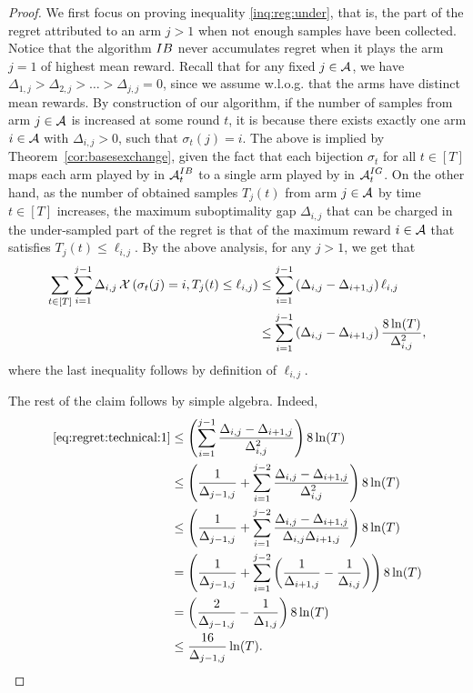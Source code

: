 \begin{proof}
We first focus on proving inequality \eqref{inq:reg:under}, that is, the part of the regret attributed to an arm $j >1$ when not enough samples have been collected. Notice that the algorithm $IB$ never accumulates regret when it plays the arm $j=1$ of highest mean reward. Recall that for any fixed $j \in \operatorname{\mathcal{A}}$, we have $\Delta_{1,j} > \Delta_{2,j} > \dots > \Delta_{j,j} = 0$, since we assume w.l.o.g. that the arms have distinct mean rewards. By construction of our algorithm, if the number of samples from arm $j \in \operatorname{\mathcal{A}}$ is increased at some round $t$, it is because there exists exactly one arm $i \in \operatorname{\mathcal{A}}$ with $\Delta_{i,j} > 0$, such that $\sigma_t(j) = i$. The above is implied by Theorem~\ref{cor:basesexchange}, given the fact that each bijection $\sigma_t$ for all $t \in [T]$ maps each arm played by \UCB in $\operatorname{\mathcal{A}}^{IB}_t$ to a single arm played by \IG in $\operatorname{\mathcal{A}}_t^{IG}$. On the other hand, as the number of obtained samples $T_j(t)$ from arm $j \in \operatorname{\mathcal{A}}$ by time $t\in [T]$ increases, the maximum suboptimality gap $\Delta_{i,j}$ that can be charged in the under-sampled part of the regret is that of the maximum reward $i \in \operatorname{\mathcal{A}}$ that satisfies $T_j(t) \leq \ell_{i,j}$. By the above analysis, for any $j>1$, we get that 
\begin{align}
\sum_{t \in [T]} \sum^{j-1}_{i = 1} \Delta_{i , j} \mathop{\mathcal{X}\left(\sigma_t(j)=i, T_j(t) \leq \ell_{i,j}\right)} \notag
&\leq \sum^{j-1}_{i=1} \left(\Delta_{i,j} -  \Delta_{i+1,j}\right)\ell_{i,j} \notag\\
&\leq \sum^{j-1}_{i=1} \left(\Delta_{i,j} -  \Delta_{i+1,j}\right)\frac{8 \ln(T)}{\Delta^2_{i,j}} \label{eq:regret:technical:1},
\end{align}
where the last inequality follows by definition of $\ell_{i,j}$.

The rest of the claim follows by simple algebra. Indeed,
\begin{align*}
    \eqref{eq:regret:technical:1}&\leq \left(\sum^{j-1}_{i=1}\frac{\Delta_{i,j} - \Delta_{i+1,j}}{\Delta^2_{i,j}}\right)8 \ln(T) \notag\\
    &\leq \left(\frac{1}{\Delta_{j-1,j}} + \sum^{j-2}_{i=1}\frac{\Delta_{i,j} - \Delta_{i+1,j}}{\Delta^2_{i,j}}\right)8 \ln(T) \notag\\
    &\leq \left(\frac{1}{\Delta_{j-1,j}} + \sum^{j-2}_{i=1}\frac{\Delta_{i,j} - \Delta_{i+1,j}}{\Delta_{i,j} \Delta_{i+1,j}}\right)8 \ln(T) \notag\\
    &= \left(\frac{1}{\Delta_{j-1,j}} + \sum^{j-2}_{i=1}\left(\frac{1}{\Delta_{i+1,j}} - \frac{1}{\Delta_{i,j}}\right)\right)8 \ln(T) \notag\\
    &= \left(\frac{2}{\Delta_{j-1,j}} - \frac{1}{\Delta_{1,j}}\right)8 \ln(T) \notag\\
    &\leq \frac{16}{\Delta_{j-1,j}} \ln(T) \notag.
\end{align*}





\end{proof}
